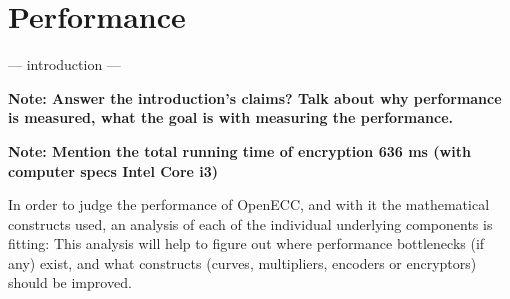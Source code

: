 \section{Performance}
\label{sec:performance}

 --- introduction ---
 
 \textbf{Note: Answer the introduction's claims? Talk about why performance is measured, what the goal is with measuring the
 performance.}
 
 \textbf{Note: Mention the total running time of encryption 636 ms (with computer specs Intel Core i3)}
 
 In order to judge the performance of OpenECC, and with it the mathematical constructs used, an analysis of each of the
 individual underlying components is fitting: This analysis will help to figure out where performance bottlenecks (if
 any) exist, and what constructs (curves, multipliers, encoders or encryptors) should be improved.



